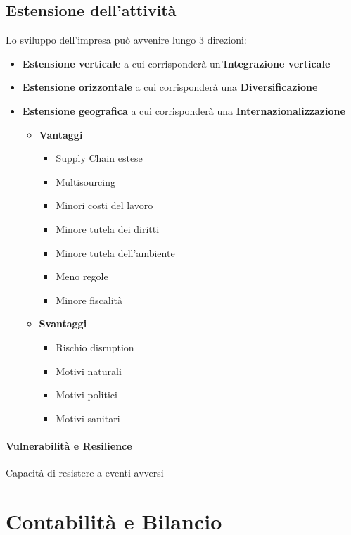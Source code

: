 \documentclass[12pt]{article}
\begin{document}
\subsection{Estensione dell'attività}
Lo sviluppo dell'impresa può avvenire lungo 3 direzioni:
\begin{itemize}
    \item \textbf{Estensione verticale} a cui corrisponderà un'\textbf{Integrazione verticale}
    \item \textbf{Estensione orizzontale} a cui corrisponderà una \textbf{Diversificazione}
    \item \textbf{Estensione geografica} a cui corrisponderà una \textbf{Internazionalizzazione}
          \begin{itemize}
              \item \textbf{Vantaggi}
                    \begin{itemize}
                        \item Supply Chain estese
                        \item Multisourcing
                        \item Minori costi del lavoro
                        \item Minore tutela dei diritti
                        \item Minore tutela dell'ambiente
                        \item Meno regole
                        \item Minore fiscalità
                    \end{itemize}
              \item \textbf{Svantaggi}
                    \begin{itemize}
                        \item Rischio disruption
                        \item Motivi naturali
                        \item Motivi politici
                        \item Motivi sanitari
                    \end{itemize}
          \end{itemize}
\end{itemize}
\paragraph{Vulnerabilità e Resilience} Capacità di resistere a eventi avversi
\newpage
\section{Contabilità e Bilancio}
\end{document}
